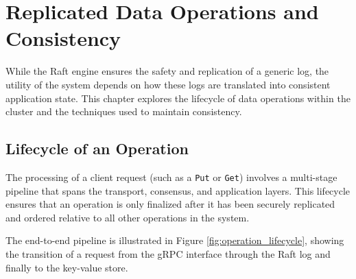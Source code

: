\chapter{Replicated Data Operations and Consistency}
\label{ch:data_operations}

While the Raft engine ensures the safety and replication of a generic log, the utility of the system depends on how these logs are translated into consistent application state. This chapter explores the lifecycle of data operations within the cluster and the techniques used to maintain consistency.

\section{Lifecycle of an Operation}
The processing of a client request (such as a \texttt{Put} or \texttt{Get}) involves a multi-stage pipeline that spans the transport, consensus, and application layers. This lifecycle ensures that an operation is only finalized after it has been securely replicated and ordered relative to all other operations in the system.

The end-to-end pipeline is illustrated in Figure \ref{fig:operation_lifecycle}, showing the transition of a request from the gRPC interface through the Raft log and finally to the key-value store.

